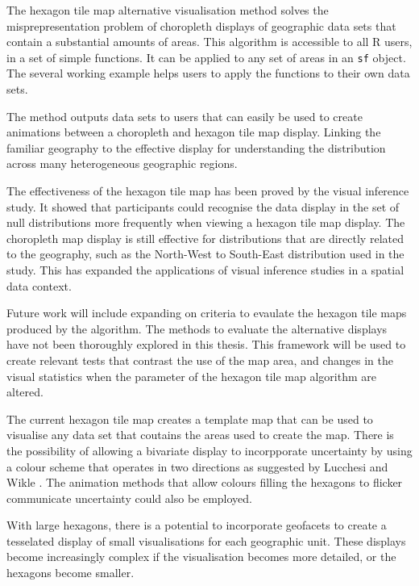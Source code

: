 \documentclass{monashthesis}
\begin{document}
The hexagon tile map alternative visualisation method solves the misprepresentation problem of choropleth displays of geographic data sets that contain a substantial amounts of areas. This algorithm is accessible to all R users, in a set of simple functions. It can be applied to any set of areas in an \texttt{sf} \autocite{sf} object. The several working example helps users to apply the functions to their own data sets.

The method outputs data sets to users that can easily be used to create animations between a choropleth and hexagon tile map display. Linking the familiar geography to the effective display for understanding the distribution across many heterogeneous geographic regions.

The effectiveness of the hexagon tile map has been proved by the visual inference study. It showed that participants could recognise the data display in the set of null distributions more frequently when viewing a hexagon tile map display. The choropleth map display is still effective for distributions that are directly related to the geography, such as the North-West to South-East distribution used in the study.
This has expanded the applications of visual inference studies in a spatial data context.

Future work will include expanding on criteria to evaulate the hexagon tile maps produced by the algorithm. The methods to evaluate the alternative displays have not been thoroughly explored in this thesis.
This framework will be used to create relevant tests that contrast the use of the map area, and changes in the visual statistics when the parameter of the hexagon tile map algorithm are altered.

The current hexagon tile map creates a template map that can be used to visualise any data set that coutains the areas used to create the map.
There is the possibility of allowing a bivariate display to incorpporate uncertainty by using a colour scheme that operates in two directions as suggested by Lucchesi and Wikle \autocite{VUADBC}.
The animation methods that allow colours filling the hexagons to flicker communicate uncertainty could also be employed.

With large hexagons, there is a potential to incorporate geofacets \autocite{IGF} to create a tesselated display of small visualisations for each geographic unit. These displays become increasingly complex if the visualisation becomes more detailed, or the hexagons become smaller.
\end{document}
